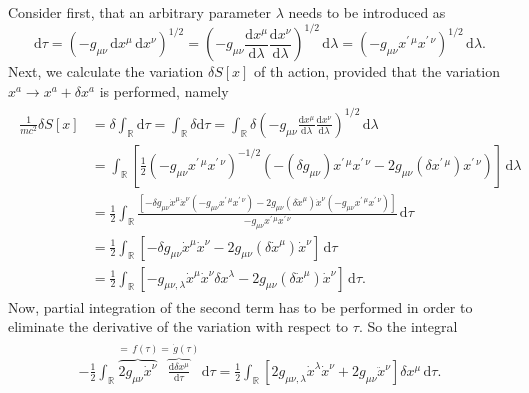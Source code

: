 \documentclass[a4paper,11pt]{article}
\numberwithin{equation}{section}
\begin{document}
{Consider first, that an arbitrary parameter $\lambda$ needs to be introduced as \begin{equation}
\mathrm{d}\tau = \left(-g_{\mu\nu}\,\mathrm{d}x^\mu\,\mathrm{d}x^\nu\right)^{1/2} =  \left(-g_{\mu\nu}\frac{\mathrm{d}x^\mu}{\mathrm{d}\lambda}\frac{\mathrm{d}x^\nu}{\mathrm{d}\lambda}\right)^{1/2}\,\mathrm{d}\lambda = (-g_{\mu\nu}x^{\prime\,\mu}x^{\prime\,\nu})^{1/2}\,\mathrm{d}\lambda.
\end{equation} Next, we calculate the variation $\delta S[x]$ of th action, provided that the variation $x^a \rightarrow x^a  + \delta x^a$ is performed, namely \begin{align}
\begin{aligned}
\frac{1}{mc^2}\delta S[x] &= \delta \int_{\mathbb{R}} \mathrm{d}\tau = \int_{\mathbb{R}} \delta \mathrm{d}\tau = \int_{\mathbb{R}} \delta \left(-g_{\mu\nu}\frac{\mathrm{d}x^\mu}{\mathrm{d}\lambda}\frac{\mathrm{d}x^\nu}{\mathrm{d}\lambda}\right)^{1/2}\,\mathrm{d}\lambda \\
&= \int_{\mathbb{R}}\left[\frac{1}{2}(-g_{\mu\nu}x^{\prime\,\mu}x^{\prime\,\nu})^{-1/2}\left(-(\delta g_{\mu\nu})x^{\prime\,\mu}x^{\prime\,\nu}-2g_{\mu\nu}(\delta x^{\prime\,\mu})x^{\prime\,\nu}\right)\right]\,\mathrm{d}\lambda \\
&= \frac{1}{2}\int_{\mathbb{R}}\frac{\left[-\delta g_{\mu\nu}\dot{x}^\mu\dot{x}^\nu(-g_{\mu\nu}x^{\prime\,\mu}x^{\prime\,\nu})-2g_{\mu\nu}(\delta \dot{x}^\mu) \dot{x}^\nu(-g_{\mu\nu}x^{\prime\,\mu}x^{\prime\,\nu})\right]}{-g_{\mu\nu}x^{\prime\,\mu}x^{\prime\,\nu}}\,\mathrm{d}\tau \\
&= \frac{1}{2}\int_{\mathbb{R}}\left[-\delta g_{\mu\nu}\dot{x}^\mu\dot{x}^\nu-2g_{\mu\nu}(\delta \dot{x}^\mu)\dot{x}^\nu\right]\,\mathrm{d}\tau \\ &= \frac{1}{2}\int_{\mathbb{R}}\left[-g_{\mu\nu,\lambda}\dot{x}^\mu\dot{x}^\nu\delta x^\lambda-2g_{\mu\nu}(\delta \dot{x}^\mu)\dot{x}^\nu\right]\,\mathrm{d}\tau.
\end{aligned}
\end{align} Now, partial integration of the second term has to be performed in order to eliminate the derivative of the variation with respect to $\tau$. So the integral \begin{align}
\begin{aligned}
-\frac{1}{2}\int_{\mathbb{R}}\overbrace{2g_{\mu\nu}\dot{x}^\nu}^{=\,f(\tau)} \overbrace{\frac{\mathrm{d}\delta x^\mu}{\mathrm{d}\tau}}^{=\,\dot{g}(\tau)}\,\mathrm{d}\tau = \frac{1}{2}\int_{\mathbb{R}}\left[2g_{\mu\nu,\lambda}\dot{x}^\lambda\dot{x}^\nu+2g_{\mu\nu}\ddot{x}^\nu\right]\delta x^\mu \,\mathrm{d}\tau.

\end{aligned}
\end{align}}
\end{document}
